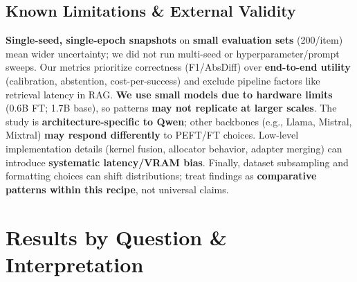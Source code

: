 \documentclass[11pt,a4paper]{article}
\begin{document}
\subsection{Known Limitations \& External Validity}

\noindent \textbf{Single-seed, single-epoch snapshots} on \textbf{small evaluation sets} (200/item) mean wider uncertainty; we did not run multi-seed or hyperparameter/prompt sweeps. Our metrics prioritize correctness (F1/AbsDiff) over \textbf{end-to-end utility} (calibration, abstention, cost-per-success) and exclude pipeline factors like retrieval latency in RAG. \textbf{We use small models due to hardware limits} (0.6B FT; 1.7B base), so patterns \textbf{may not replicate at larger scales}. The study is \textbf{architecture-specific to Qwen}; other backbones (e.g., Llama, Mistral, Mixtral) \textbf{may respond differently} to PEFT/FT choices. Low-level implementation details (kernel fusion, allocator behavior, adapter merging) can introduce \textbf{systematic latency/VRAM bias}. Finally, dataset subsampling and formatting choices can shift distributions; treat findings as \textbf{comparative patterns within this recipe}, not universal claims.

\section{Results by Question \& Interpretation}
\end{document}
